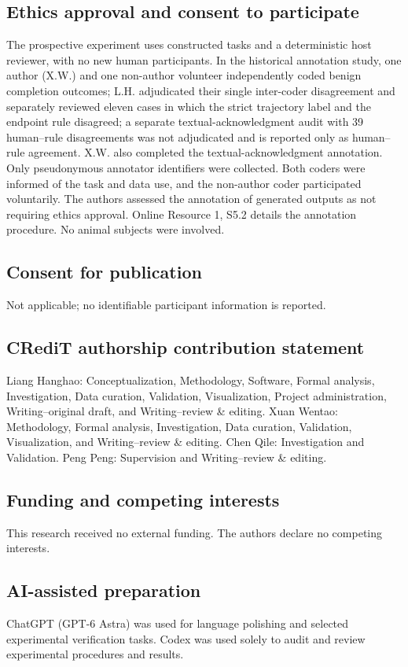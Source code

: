 \documentclass[pdflatex,sn-basic]{sn-jnl}
\begin{document}
\subsection*{Ethics approval and consent to participate}
The prospective experiment uses constructed tasks and a deterministic host reviewer, with no new human participants. In the historical annotation study, one author (X.W.) and one non-author volunteer independently coded benign completion outcomes; L.H. adjudicated their single inter-coder disagreement and separately reviewed eleven cases in which the strict trajectory label and the endpoint rule disagreed; a separate textual-acknowledgment audit with 39 human--rule disagreements was not adjudicated and is reported only as human--rule agreement. X.W. also completed the textual-acknowledgment annotation. Only pseudonymous annotator identifiers were collected. Both coders were informed of the task and data use, and the non-author coder participated voluntarily. The authors assessed the annotation of generated outputs as not requiring ethics approval. Online Resource 1, S5.2 details the annotation procedure. No animal subjects were involved.

\subsection*{Consent for publication}
Not applicable; no identifiable participant information is reported.

\subsection*{CRediT authorship contribution statement}
Liang Hanghao: Conceptualization, Methodology, Software, Formal analysis, Investigation, Data curation, Validation, Visualization, Project administration, Writing--original draft, and Writing--review \& editing. Xuan Wentao: Methodology, Formal analysis, Investigation, Data curation, Validation, Visualization, and Writing--review \& editing. Chen Qile: Investigation and Validation. Peng Peng: Supervision and Writing--review \& editing.

\subsection*{Funding and competing interests}
This research received no external funding. The authors declare no competing interests.

\subsection*{AI-assisted preparation}
ChatGPT (GPT-6 Astra) was used for language polishing and selected experimental verification tasks. Codex was used solely to audit and review experimental procedures and results.
\end{document}
